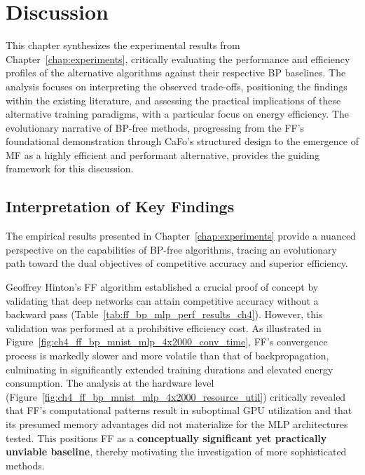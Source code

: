 \section{Discussion}
\label{chap:discussion}

This chapter synthesizes the experimental results from Chapter~\ref{chap:experiments}, critically evaluating the performance and efficiency profiles of the alternative algorithms against their respective BP baselines. The analysis focuses on interpreting the observed trade-offs, positioning the findings within the existing literature, and assessing the practical implications of these alternative training paradigms, with a particular focus on energy efficiency. The evolutionary narrative of BP-free methods, progressing from the FF's foundational demonstration through CaFo's structured design to the emergence of MF as a highly efficient and performant alternative, provides the guiding framework for this discussion.

\subsection{Interpretation of Key Findings}
\label{sec:discussion_interpretation}

The empirical results presented in Chapter~\ref{chap:experiments} provide a nuanced perspective on the capabilities of BP-free algorithms, tracing an evolutionary path toward the dual objectives of competitive accuracy and superior efficiency.

Geoffrey Hinton's FF algorithm established a crucial proof of concept by validating that deep networks can attain competitive accuracy without a backward pass (Table~\ref{tab:ff_bp_mlp_perf_results_ch4}). However, this validation was performed at a prohibitive efficiency cost. As illustrated in Figure~\ref{fig:ch4_ff_bp_mnist_mlp_4x2000_conv_time}, FF's convergence process is markedly slower and more volatile than that of backpropagation, culminating in significantly extended training durations and elevated energy consumption. The analysis at the hardware level (Figure~\ref{fig:ch4_ff_bp_mnist_mlp_4x2000_resource_util}) critically revealed that FF's computational patterns result in suboptimal GPU utilization and that its presumed memory advantages did not materialize for the MLP architectures tested. This positions FF as a \textbf{conceptually significant yet practically unviable baseline}, thereby motivating the investigation of more sophisticated methods.

